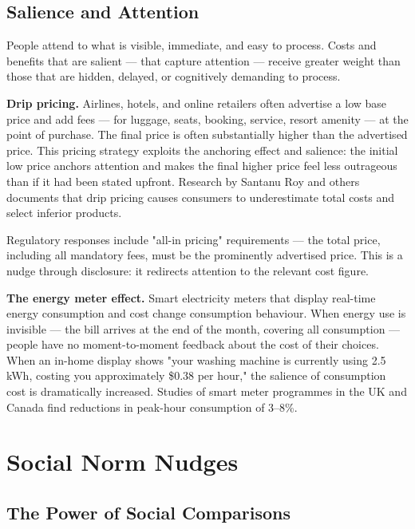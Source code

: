 \documentclass[12pt, letterpaper]{article}
\begin{document}
\subsection{Salience and Attention}


People attend to what is visible, immediate, and easy to process. Costs and benefits that are salient --- that capture attention --- receive greater weight than those that are hidden, delayed, or cognitively demanding to process.

\textbf{Drip pricing.} Airlines, hotels, and online retailers often advertise a low base price and add fees --- for luggage, seats, booking, service, resort amenity --- at the point of purchase. The final price is often substantially higher than the advertised price. This pricing strategy exploits the anchoring effect and salience: the initial low price anchors attention and makes the final higher price feel less outrageous than if it had been stated upfront. Research by Santanu Roy and others documents that drip pricing causes consumers to underestimate total costs and select inferior products.

Regulatory responses include "all-in pricing" requirements --- the total price, including all mandatory fees, must be the prominently advertised price. This is a nudge through disclosure: it redirects attention to the relevant cost figure.

\textbf{The energy meter effect.} Smart electricity meters that display real-time energy consumption and cost change consumption behaviour. When energy use is invisible --- the bill arrives at the end of the month, covering all consumption --- people have no moment-to-moment feedback about the cost of their choices. When an in-home display shows "your washing machine is currently using 2.5 kWh, costing you approximately \$0.38 per hour," the salience of consumption cost is dramatically increased. Studies of smart meter programmes in the UK and Canada find reductions in peak-hour consumption of 3--8\%.

\medskip


\section{Social Norm Nudges}



\subsection{The Power of Social Comparisons}
\end{document}
